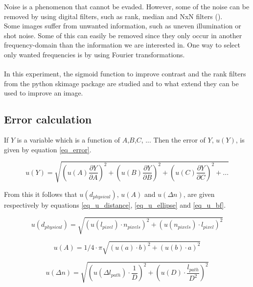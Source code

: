 Noise is a phenomenon that cannot be evaded. However, some of the noise can be removed by using digital filters, such as rank, median and NxN filters (\cite{tutorial}).\\
Some images suffer from unwanted information, such as uneven illumination or shot noise. Some of this can easily be removed since they only  occur in another frequency-domain than the information we are interested in. One way to select only wanted frequencies is by using Fourier transformations.\\
\\
In this experiment, the sigmoid function to improve contrast and the rank filters from the python skimage package are studied and to what extend they can be used to improve an image.\\



\subsection{Error calculation}

If $Y$ is a variable which is a function of $A$,$B$,$C$, ... Then the error of $Y$, $u(Y)$, is given by equation \ref{eq_error}.

\begin{equation}
	\label{eq_error}
	u(Y) = \sqrt{\left(u(A) \frac{\partial Y}{\partial A}\right)^2 + \left(u(B) \frac{\partial Y}{\partial B}\right)^2 + \left(u(C) \frac{\partial Y}{\partial C}\right)^2 + ...}
\end{equation}

From this it follows that $u(d_{physical})$, $u(A)$ and $u(\Delta n)$, are given respectively by equations \ref{eq_u_distance}, \ref{eq_u_ellipse} and \ref{eq_u_bf}.

\begin{equation}
	\label{eq_u_distance}
	u(d_{physical}) = \sqrt{\left( u(l_{pixel}) \cdot n_{pixels} \right)^2 + \left( u(n_{pixels}) \cdot l_{pixel} \right)^2}
\end{equation}

\begin{equation}
	\label{eq_u_ellipse}
	u(A) = 1/4 \cdot \pi  \sqrt{(u(a) \cdot b)^2 + (u(b) \cdot a)^2}
\end{equation}

\begin{equation}
	\label{eq_u_bf}
	u(\Delta n) = \sqrt{\left( u(\Delta l_{path}) \cdot \frac{1}{D}\right)^2 + \left( u(D) \cdot \frac{l_{path}}{D^2}\right)^2}
\end{equation}
